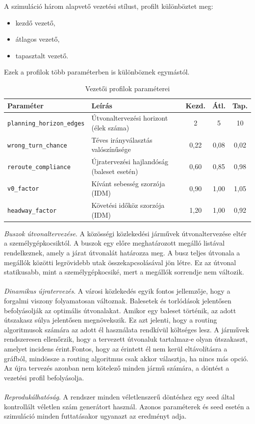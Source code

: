 \documentclass[14pt,a4paper]{extarticle}
\begin{document}
A szimuláció három alapvető vezetési stílust, profilt különböztet meg:
\begin{itemize}
    \item kezdő vezető,
    \item átlagos vezető,
    \item tapasztalt vezető.
\end{itemize}
Ezek a profilok több paraméterben is különböznek egymástól.


\begin{table}[ht]
\centering
\caption{Vezetői profilok paraméterei}
\label{tab:driver_profiles}
\begin{tabularx}{\textwidth}{@{}lXccc@{}} %
\toprule
\textbf{Paraméter} & \textbf{Leírás} & \textbf{Kezd.} & \textbf{Átl.} & \textbf{Tap.} \\ \midrule
\texttt{planning\_horizon\_edges} & Útvonaltervezési horizont (élek száma) & 2 & 5 & 10 \\
\texttt{wrong\_turn\_chance}      & Téves irányválasztás valószínűsége & 0,22 & 0,08 & 0,02 \\
\texttt{reroute\_compliance}      & Újratervezési hajlandóság (baleset esetén) & 0,60 & 0,85 & 0,98 \\
\texttt{v0\_factor}               & Kívánt sebesség szorzója (IDM) & 0,90 & 1,00 & 1,05 \\
\texttt{headway\_factor}          & Követési időköz szorzója (IDM) & 1,20 & 1,00 & 0,92 \\ \bottomrule
\end{tabularx}
\end{table}

\textit{Buszok útvonaltervezése}. A közösségi közlekedési járművek útvonaltervezése eltér a személygépkocsiktól. A buszok egy előre meghatározott megálló listával rendelkeznek, amely a járat útvonalát határozza meg. A busz teljes útvonala a megállók közötti legrövidebb utak összekapcsolásával jön létre. Ez az útvonal statikusabb, mint a személygépkocsiké, mert a megállók sorrendje nem változik.
\\
\\
\textit{Dinamikus újratervezés}. A városi közlekedés  egyik fontos jellemzője, hogy a forgalmi viszony folyamatosan változnak. Balesetek és torlódások jelentősen befolyásolják az optimális útvonalakat. Amikor egy baleset történik, az adott útszakasz súlya jelentősen megnövekszik. Ez azt jelenti, hogy a routing algoritmusok számára az adott él használata rendkívül költséges lesz. A járművek rendszeresen ellenőrzik, hogy a tervezett útvonaluk tartalmaz-e olyan útszakaszt, amelyet incidens érint.Fontos, hogy az érintett  él nem kerül eltávolításra a gráfból, mindössze a routing algoritmus csak akkor választja, ha nincs más opció. Az újra tervezés azonban nem kötelező minden jármű számára, a döntést a vezetési profil befolyásolja.
\\
\\
\textit{Reprodukálhatóság}. A rendszer minden véletlenszerű döntéshez egy seed által kontrollált véletlen szám generátort használ. Azonos paraméterek és seed esetén a szimuláció minden futtatásakor ugyanazt az eredményt adja.
\end{document}
